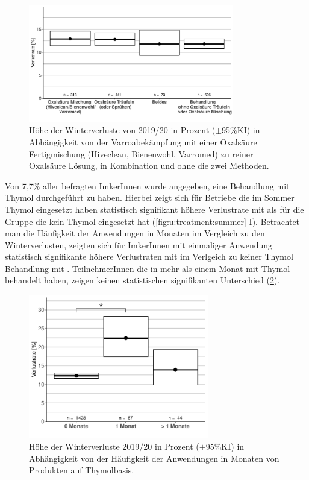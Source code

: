 \begin{figure}[H]
  \centering
  \includegraphics[keepaspectratio,width=0.8\textwidth]{project-U-wintersterblichkeit/figures/plot_treatment_oxalmix}
  \caption{Höhe der Winterverluste von 2019/20 in Prozent ($\pm$95\%KI) in Abhängigkeit von der Varroabekämpfung mit einer Oxalsäure Fertigmischung (Hiveclean, Bienenwohl, Varromed) zu reiner Oxalsäure Lösung, in Kombination und ohne die zwei Methoden.}
  \label{fig:u:treatment:oxalmix}
\end{figure}


Von 7,7\% aller befragten ImkerInnen wurde angegeben, eine Behandlung mit Thymol durchgeführt zu haben. Hierbei zeigt sich für Betriebe die im Sommer Thymol eingesetzt haben statistisch signifikant höhere Verlustrate mit  als für die Gruppe die kein Thymol eingesetzt hat  (\cref{fig:u:treatment:summer}-I).
\newline
Betrachtet man die Häufigkeit der Anwendungen in Monaten im Vergleich zu den Winterverlusten, zeigten sich für ImkerInnen mit einmaliger Anwendung statistisch signifikante höhere Verlustraten mit  im Verlgeich zu keiner Thymol Behandlung mit . TeilnehmerInnen die in mehr als einem Monat mit Thymol behandelt haben, zeigen keinen statistischen signifikanten Unterschied  (\cref{fig:u:treatment:thymol:grouped}).

\begin{figure}[H]
  \centering
  \includegraphics[keepaspectratio,width=0.7\textwidth]{project-U-wintersterblichkeit/figures/plot_treatment_thymol_grouped}
  \caption{Höhe der Winterverluste 2019/20 in Prozent (\(\pm\)95\%KI) in Abhängigkeit von der Häufigkeit der Anwendungen in Monaten von Produkten auf Thymolbasis.}
  \label{fig:u:treatment:thymol:grouped}
\end{figure}

